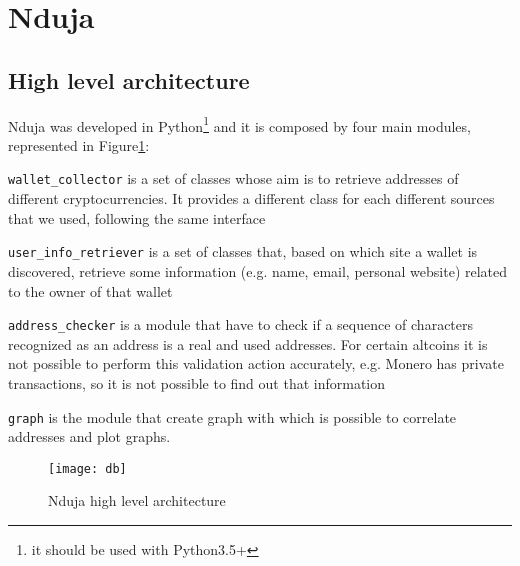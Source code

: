 \newcommand{\walletcollector}{\texttt{wallet\_collector}}
\newcommand{\userinforetriever}{\texttt{user\_info\_retriever}}
\newcommand{\addresschecker}{\texttt{address\_checker}}
\newcommand{\graph}{\texttt{graph}}

\section{Nduja}
\subsection{High level architecture}
Nduja was developed in Python\footnote{it should be used with Python3.5+} and it
is composed by four main modules, represented in Figure\ref{fig:architecture}:
\begin{enumerate*}[label=\roman*),itemjoin={,\quad}]
\item \walletcollector{} is a set of classes whose aim is to retrieve
addresses of different cryptocurrencies. It provides a different class for each
different sources that we used, following the same interface
\item \userinforetriever{} is a set of classes that, based on which
site a wallet is discovered, retrieve some information (e.g. name, email,
personal website) related to the owner of that wallet
\item \addresschecker{} is a module that have to check if a sequence of
characters recognized as an address is a real and used addresses. For certain
altcoins it is not possible to perform this validation action accurately, e.g.
Monero has private transactions, so it is not possible to find out that
information
\item \graph{} is the module that create graph with which is possible to
correlate addresses and plot graphs.
\end{enumerate*}

\begin{figure}[t]
\centering
\texttt{[image: db]}
\caption{Nduja high level architecture}
\label{fig:architecture}
\end{figure}

